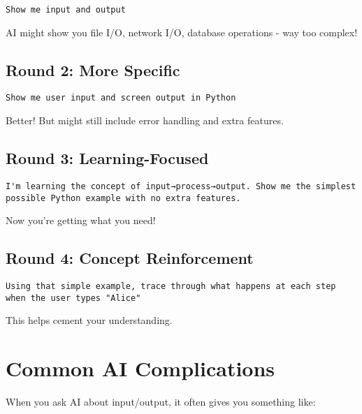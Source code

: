 \documentclass[
  letterpaper,
  DIV=11,
  numbers=noendperiod,
  oneside]{scrreprt}
\begin{document}
\begin{verbatim}
Show me input and output
\end{verbatim}

AI might show you file I/O, network I/O, database operations - way too
complex!

\subsection{Round 2: More Specific}\label{round-2-more-specific}

\begin{verbatim}
Show me user input and screen output in Python
\end{verbatim}

Better! But might still include error handling and extra features.

\subsection{Round 3: Learning-Focused}\label{round-3-learning-focused}

\begin{verbatim}
I'm learning the concept of input→process→output. Show me the simplest possible Python example with no extra features.
\end{verbatim}

Now you're getting what you need!

\subsection{Round 4: Concept
Reinforcement}\label{round-4-concept-reinforcement}

\begin{verbatim}
Using that simple example, trace through what happens at each step when the user types "Alice"
\end{verbatim}

This helps cement your understanding.

\section{Common AI Complications}\label{common-ai-complications}

When you ask AI about input/output, it often gives you something like:
\end{document}
